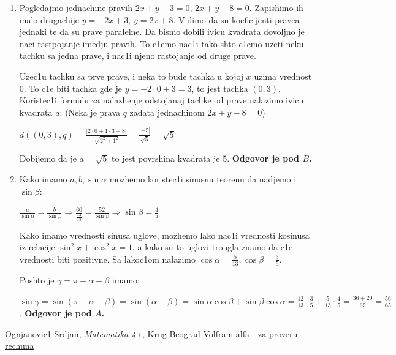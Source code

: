 \documentclass[a4paper,12pt]{article}
\begin{document}
\begin{enumerate}[1.]
\item Pogledajmo jednachine pravih $2x + y - 3 = 0$, $2x +y -8 = 0$. Zapishimo ih malo drugachije $y = -2x +3$, $y=  2x + 8$. Vidimo da su koeficijenti pravca jednaki te da su prave paralelne. Da bismo dobili ivicu kvadrata dovoljno je naci rastpojanje imedju pravih. To c1emo nac1i tako shto c1emo uzeti neku tachku sa jedna prave, i nac1i njeno rastojanje od druge prave.
\par Uzec1u tachku sa prve prave, i neka to bude tachka u kojoj $x$ uzima vrednost 0. To c1e biti tachka gde je $y = -2 \cdot 0 +3 = 3$, to jest tachka $(0,3)$. Koristec1i formulu za nalazhenje odstojanaj tachke od prave nalazimo ivicu kvadrata $a$: (Neka je prava $q$ zadata jednachinom $ 2x+y-8 = 0$)
\par $d((0,3), q) = \frac{|2 \cdot 0 + 1 \cdot 3 -8|}{\sqrt{2^2 + 1^2}} = \frac{|-5|}{\sqrt{5}} = \sqrt{5}$
\par Dobijemo da je $a = \sqrt{5}$ to jest povrshina kvadrata je 5. \textbf{Odgovor je pod $B$.} 


\item Kako imamo $a,b,\sin{\alpha} $ mozhemo koristec1i sinusnu teorenu da nadjemo i $\sin{\beta}$:
\par $ \frac{a}{\sin{\alpha}}= \frac{b}{\sin{\beta}}  \Longrightarrow \frac{60}{\frac{12}{13}}= \frac{52}{\sin{\beta}} \Longrightarrow \sin{\beta} = \frac{4}{5} $
\par Kako imamo vrednosti sinusa uglove, mozhemo lako nac1i vrednosti kosinusa iz relacije $\sin^2  x  +\cos^2  x  = 1$, a kako su to uglovi trougla znamo da c1e vrednosti biti pozitivne. Sa lakoc1om nalazimo $\cos{\alpha} = \frac{5}{13}, \cos{\beta} = \frac{3}{5} $.
\par Poshto je $\gamma = \pi - \alpha - \beta$ imamo: 
\par $\sin{\gamma} = \sin(\pi - \alpha - \beta)= \sin( \alpha + \beta) = \sin{\alpha}\cos{\beta} + \sin{\beta} \cos{\alpha} = \frac{12}{13}\cdot \frac{3}{5} + \frac{5}{13}  \cdot \frac{4}{5} = \frac{36+20}{65} = \frac{56}{65} $. \textbf{Odgovor je pod $A$.}


\end{enumerate}
\newpage



\begin{thebibliography}{9}

 Ognjanovic1 Srdjan, {\it Matematika 4+}, Krug Beograd
 \href{https://www.wolframalpha.com/}{Volfram alfa - za proveru rechuna}

\end{thebibliography}
\end{document}
